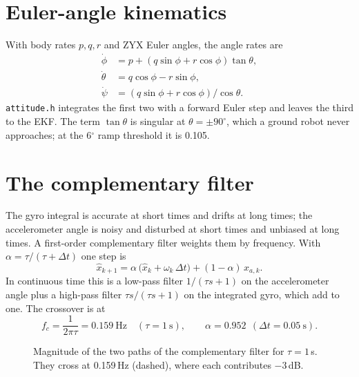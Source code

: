 \documentclass[11pt,a4paper]{report}
\newcommand{\code}[1]{\texttt{#1}}
\begin{document}
\section{Euler-angle kinematics}
With body rates $p,q,r$ and ZYX Euler angles, the angle rates are
\begin{align}
  \dot\phi&=p+(q\sin\phi+r\cos\phi)\tan\theta,\\
  \dot\theta&=q\cos\phi-r\sin\phi,\\
  \dot\psi&=(q\sin\phi+r\cos\phi)/\cos\theta. \label{eq:euler}
\end{align}
\code{attitude.h} integrates the first two with a forward Euler step and leaves the third to the EKF. The term $\tan\theta$ is singular at $\theta=\pm90^\circ$, which a ground robot never approaches; at the 6$^\circ$ ramp threshold it is 0.105.

\section{The complementary filter}\label{sec:cf}
The gyro integral is accurate at short times and drifts at long times; the accelerometer angle is noisy and disturbed at short times and unbiased at long times. A first-order complementary filter weights them by frequency. With $\alpha=\tau/(\tau+\Delta t)$ one step is
\begin{equation}
  \hat x_{k+1}=\alpha\,\bigl(\hat x_k+\omega_k\,\Delta t\bigr)+(1-\alpha)\,x_{a,k}. \label{eq:cf}
\end{equation}
In continuous time this is a low-pass filter $1/(\tau s+1)$ on the accelerometer angle plus a high-pass filter $\tau s/(\tau s+1)$ on the integrated gyro, which add to one. The crossover is at
\begin{equation}
  f_c=\frac{1}{2\pi\tau}=0.159\ \mathrm{Hz}\quad(\tau=1\ \mathrm s),\qquad \alpha=0.952\ \ (\Delta t=0.05\ \mathrm s). \label{eq:fc}
\end{equation}

\begin{figure}[H]
\centering
{}
\caption{Magnitude of the two paths of the complementary filter for $\tau=1$\,s. They cross at 0.159\,Hz (dashed), where each contributes $-3$\,dB.}\label{fig:cfbode}
\end{figure}
\end{document}
